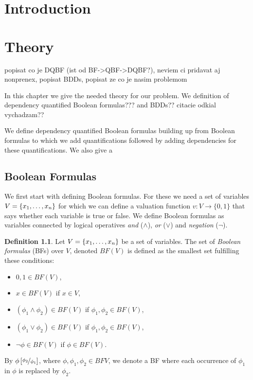 \documentclass[
  digital, %
  twoside, %
  table,   %
  nolof,     %
  nolot,     %
]{fithesis3}
\let\setbuilder\set
\newcommand{\simpleset}[1]{\{{#1}\}}
\renewcommand{\set}[1]{\normalexpandarg\IfSubStr{#1}{|}{\setbuilder{#1}}{\simpleset{#1}}}
\theoremstyle{definition}
\newtheorem{definition}{Definition}
\theoremstyle{remark}
\newcommand{\substitute}[2]{\left[ \nicefrac{#2}{#1} \right]}
\newcommand{\BF}[1]{BF(#1)}
\begin{document}
\chapter*{Introduction}

\chapter{Theory}
popisat co je DQBF (ist od BF->QBF->DQBF?), neviem ci pridavat aj nonprenex, popisat BDDs, popisat ze co je nasim problemom

In this chapter we give the needed theory for our problem. We definition of dependency quantified Boolean formulas??? and BDDs?? citacie odkial vychadzam??

We define dependency quantified Boolean formulas building up from Boolean formulas to which we add quantifications followed by adding dependencies for these quantifications. We also give a 

\section{Boolean Formulas}

We first start with defining Boolean formulas. For these we need a set of variables $V = \set{x_1, \dots, x_n}$ for which we can define a valuation function $v\colon V \to \{0,1\}$ that says whether each variable is true or false. We define Boolean formulas as variables connected by logical operatives \emph{and} (${\land}$), \emph{or} (${\lor}$) and \emph{negation} (${\neg}$).

\begin{definition}
Let $V = \set{x_1, \dots, x_n}$ be a set of variables. The set of \emph{Boolean formulas} (BFs) over $V$, denoted $\BF{V}$ is defined as the smallest set fulfilling these conditions:
\begin{itemize}
    \item $0,1 \in \BF{V}$,
    \item $x \in \BF{V}$ if $x \in V$,
    \item $(\phi_1 \land \phi_2) \in \BF{V}$ if $\phi_1, \phi_2 \in \BF{V}$,
    \item $(\phi_1 \lor \phi_2) \in \BF{V}$ if $\phi_1, \phi_2 \in \BF{V}$,
    \item $\neg\phi \in \BF{V}$ if $\phi \in \BF{V}$.
\end{itemize}
\end{definition}
By $\phi\substitute{\phi_1}{\phi_2}$, where $\phi,\phi_1,\phi_2 \in BF{V}$, we denote a BF where each occurrence of $\phi_1$ in $\phi$ is replaced by $\phi_2$.
\end{document}
